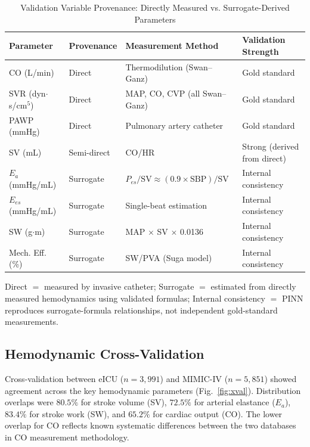 \documentclass[journal]{IEEEtran}
\begin{document}
\begin{table}[!t]
\caption{Validation Variable Provenance: Directly Measured vs. Surrogate-Derived Parameters}
\label{tab:prov}
\centering
\footnotesize
\begin{tabular}{llll}
\hline
\textbf{Parameter} & \textbf{Provenance} & \textbf{Measurement Method} & \textbf{Validation Strength}\\
\hline
CO (L/min) & Direct & Thermodilution (Swan--Ganz) & Gold standard\\
SVR (dyn$\cdot$s/cm$^5$) & Direct & MAP, CO, CVP (all Swan--Ganz) & Gold standard\\
PAWP (mmHg) & Direct & Pulmonary artery catheter & Gold standard\\
SV (mL) & Semi-direct & CO/HR & Strong (derived from direct)\\
$E_a$ (mmHg/mL) & Surrogate & $P_{es}/\text{SV}\approx(0.9\times\text{SBP})/\text{SV}$ & Internal consistency\\
$E_{es}$ (mmHg/mL) & Surrogate & Single-beat estimation & Internal consistency\\
SW (g$\cdot$m) & Surrogate & MAP $\times$ SV $\times$ 0.0136 & Internal consistency\\
Mech. Eff. (\%) & Surrogate & SW/PVA (Suga model) & Internal consistency\\
\hline
\end{tabular}

\vspace{2pt}
\begin{minipage}{\textwidth}
\footnotesize Direct $=$ measured by invasive catheter; Surrogate $=$ estimated from directly measured hemodynamics using validated formulas; Internal consistency $=$ PINN reproduces surrogate-formula relationships, not independent gold-standard measurements.
\end{minipage}
\end{table}


\subsection{Hemodynamic Cross-Validation}\label{sec:xval}
Cross-validation between eICU ($n=3{,}991$) and MIMIC-IV ($n=5{,}851$) showed agreement across the key hemodynamic parameters (Fig.~\ref{fig:xval}). Distribution overlaps were $80.5\%$ for stroke volume (SV), $72.5\%$ for arterial elastance ($E_a$), $83.4\%$ for stroke work (SW), and $65.2\%$ for cardiac output (CO). The lower overlap for CO reflects known systematic differences between the two databases in CO measurement methodology.
\end{document}
